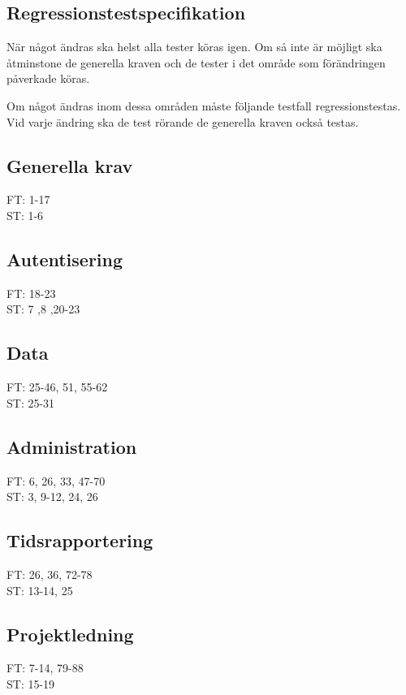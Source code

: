 \documentclass[a4paper]{article}
\begin{document}
\begin{appendices}

\section{Regressionstestspecifikation}

När något ändras ska helst alla tester köras igen. Om så inte är möjligt ska åtminstone de generella kraven och de tester i det område som förändringen påverkade köras.

Om något ändras inom dessa områden måste följande testfall regressionstestas. Vid varje ändring ska de test rörande de generella kraven också testas.

\subsection{Generella krav}

FT: 1-17\\
ST: 1-6

\subsection{Autentisering}

FT: 18-23\\
ST: 7 ,8 ,20-23

\subsection{Data}

FT: 25-46, 51, 55-62\\
ST: 25-31

\subsection{Administration}

FT: 6, 26, 33, 47-70 \\
ST: 3, 9-12, 24, 26

\subsection{Tidsrapportering}

FT: 26, 36, 72-78\\
ST: 13-14, 25

\subsection{Projektledning}

FT: 7-14, 79-88\\
ST: 15-19

\end{appendices}
\end{document}
